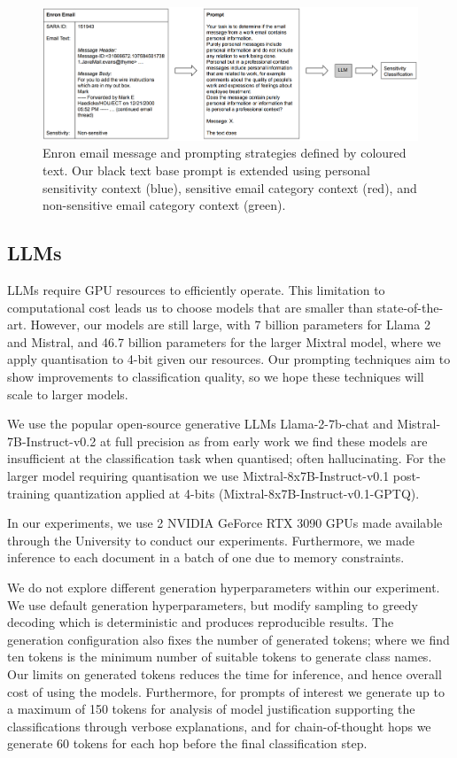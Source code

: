 \begin{figure}
\begin{center}
\includegraphics[scale=0.3]{figures/inputprompt.pdf}
\end{center}
\caption{\label{fig-input}Enron email message and prompting strategies defined by coloured text. Our black text base prompt is extended using personal sensitivity context (blue), sensitive email category context (red), and non-sensitive email category context (green).}
\end{figure}

\subsection{LLMs}
\label{sec:experiment:LLMs}
LLMs require GPU resources to efficiently operate. This limitation to computational cost leads us to choose models that are smaller than state-of-the-art. However, our models are still large, with 7 billion parameters for Llama 2 and Mistral, and 46.7 billion parameters for the larger Mixtral model, where we apply quantisation \cite{frantar2022gptq} to 4-bit given our resources. Our prompting techniques aim to show improvements to classification quality, so we hope these techniques will scale to larger models.

We use the popular open-source generative LLMs Llama-2-7b-chat and Mistral-7B-Instruct-v0.2 at full precision as from early work we find these models are insufficient at the classification task when quantised; often hallucinating. For the larger model requiring quantisation we use Mixtral-8x7B-Instruct-v0.1 post-training quantization \cite{frantar2022gptq} applied at 4-bits (Mixtral-8x7B-Instruct-v0.1-GPTQ).

In our experiments, we use 2 NVIDIA GeForce RTX 3090 GPUs made available through the University to conduct our experiments. Furthermore, we made inference to each document in a batch of one due to memory constraints.

We do not explore different generation hyperparameters within our experiment. We use default generation hyperparameters, but modify sampling to greedy decoding which is deterministic and produces reproducible results. The generation configuration also fixes the number of generated tokens; where we find ten tokens is the minimum number of suitable tokens to generate class names. Our limits on generated tokens reduces the time for inference, and hence overall cost of using the models. Furthermore, for prompts of interest we generate up to a maximum of 150 tokens for analysis of model justification supporting the classifications through verbose explanations, and for chain-of-thought hops we generate 60 tokens for each hop before the final classification step.

